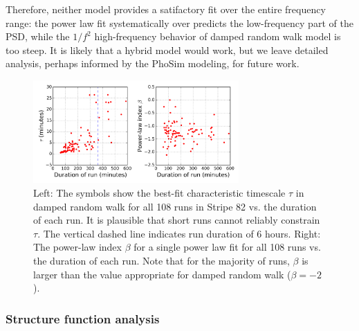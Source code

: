 Therefore, neither model provides a satifactory fit over the entire frequency range: 
the power law fit systematically over predicts the low-frequency part of the PSD,
while the $1/f^2$ high-frequency behavior of damped random walk model is too 
steep. It is likely that a hybrid model would work, but we leave detailed analysis,
perhaps informed by the PhoSim modeling, for future work. 


\begin{figure}[th]
\centering
\includegraphics[width=0.7\textwidth]{FIGURES/taubeta.png}
\vskip -0.2in
\caption{Left: The symbols show the best-fit characteristic timescale $\tau$ in 
damped random walk for all 108 runs in Stripe 82 vs. the duration of 
each run. It is plausible that short runs cannot reliably constrain
$\tau$.
The vertical dashed line indicates run duration of 6 hours.
Right: The power-law index $\beta$ for a single power law fit for all 108 
runs vs. the duration of each run. Note that for the majority of runs, $\beta$
is larger than the value appropriate for damped random walk ($\beta = -2$). 
\label{fig:hist}}
\end{figure}



\subsubsection{Structure function analysis} 


